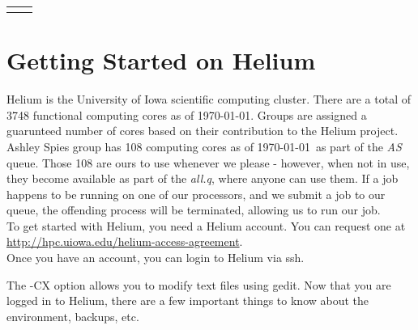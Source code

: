 \maketitle %

\begin{tabular}{lr}
\date
\end{tabular}

\setlength\parindent{0pt} %

\renewcommand{\labelenumi}{\alph{enumi}.} %



\section{Getting Started on Helium}

Helium is the University of Iowa scientific computing cluster. There are a total of 3748 functional computing cores as of \today. Groups are assigned a guarunteed number of cores based on their contribution to the Helium project. Ashley Spies group has 108 computing cores as of \today\ as part of the \emph{AS} queue. Those 108 are ours to use whenever we please - however, when not in use, they become available as part of the \emph{all.q}, where anyone can use them. If a job happens to be running on one of our processors, and we submit a job to our queue, the offending process will be terminated, allowing us to run our job.\\

To get started with Helium, you need a Helium account. You can request one at \url{http://hpc.uiowa.edu/helium-access-agreement}. \\

Once you have an account, you can login to Helium via ssh.

\begin{quote}
\end{quote}


The -CX option allows you to modify text files using gedit. Now that you are logged in to Helium, there are a few important things to know about the environment, backups, etc. 

